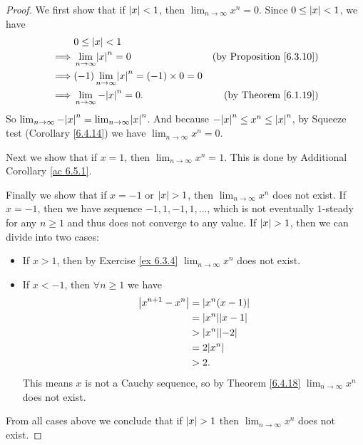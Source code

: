 \begin{proof}
    We first show that if \(\left\lvert x\right\rvert < 1\), then \(\lim_{n \to \infty} x^n = 0\).
    Since \(0 \leq \left\lvert x\right\rvert < 1\), we have
    \begin{align*}
                 & 0 \leq \abs{x} < 1                                                                           \\
        \implies & \lim_{n \to \infty} \abs{x}^n = 0                     & \text{(by Proposition \ref{6.3.10})} \\
        \implies & (-1)\lim_{n \to \infty} \abs{x}^n = (-1) \times 0 = 0                                        \\
        \implies & \lim_{n \to \infty} -\abs{x}^n = 0.                   & \text{(by Theorem \ref{6.1.19})}
    \end{align*}
    So \(\lim_{n \to \infty} -\abs{x}^n = \lim_{n \to \infty} \abs{x}^n\).
    And because \(-\abs{x}^n \leq x^n \leq \abs{x}^n\), by Squeeze test (Corollary \ref{6.4.14}) we have \(\lim_{n \to \infty} x^n = 0\).

    Next we show that if \(x = 1\), then \(\lim_{n \to \infty} x^n = 1\).
    This is done by Additional Corollary \ref{ac 6.5.1}.

    Finally we show that if \(x = -1\) or \(\left\lvert x\right\rvert > 1\), then \(\lim_{n \to \infty} x^n\) does not exist.
    If \(x = -1\), then we have sequence \(-1, 1, -1, 1, \dots\), which is not eventually \(1\)-steady for any \(n \geq 1\) and thus does not converge to any value.
    If \(\left\lvert x\right\rvert > 1\), then we can divide into two cases:
    \begin{itemize}
        \item If \(x > 1\), then by Exercise \ref{ex 6.3.4} \(\lim_{n \to \infty} x^n\) does not exist.
        \item If \(x < -1\), then \(\forall n \geq 1\) we have
              \begin{align*}
                  \abs{x^{n + 1} - x^n} & = \abs{x^n(x - 1)}     \\
                                        & = \abs{x^n}\abs{x - 1} \\
                                        & > \abs{x^n}\abs{-2}    \\
                                        & = 2\abs{x^n}           \\
                                        & > 2.
              \end{align*}
              This means \(x\) is not a Cauchy sequence, so by Theorem \ref{6.4.18} \(\lim_{n \to \infty} x^n\) does not exist.
    \end{itemize}
    From all cases above we conclude that if \(\left\lvert x\right\rvert > 1\) then \(\lim_{n \to \infty} x^n\) does not exist.
\end{proof}


